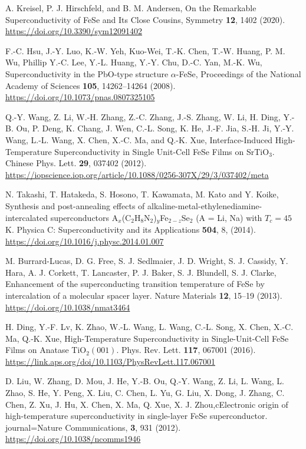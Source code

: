 \documentclass[prb,twocolumn,amsmath,amssymb,superscriptaddress,floatfix,nofootinbib]{revtex4-2}
\begin{document}
\begin{thebibliography}{}
A. Kreisel, P. J. Hirschfeld, and B. M. Andersen, On the Remarkable Superconductivity of FeSe and Its Close Cousins, Symmetry {\bf 12}, 1402
(2020). \url{https://doi.org/10.3390/sym12091402}

F.-C. Hsu, J.-Y. Luo, K.-W. Yeh, Kuo-Wei, T.-K. Chen, T.-W. Huang, P. M. Wu, Phillip Y.-C. Lee, Y.-L. Huang, Y.-Y. Chu, D.-C. Yan, M.-K. Wu, {Superconductivity in the {PbO}-type structure {$\alpha$-FeSe}}, {Proceedings of the National Academy of Sciences} {\bf 105}, {14262--14264} (2008). \url{https://doi.org/10.1073/pnas.0807325105}

Q.-Y. Wang, Z. Li, W.-H. Zhang, Z.-C. Zhang, J.-S. Zhang, W. Li, H. Ding, Y.-B. Ou, P. Deng, K. Chang, J. Wen, C.-L. Song, K. He, J.-F. Jia, S.-H. Ji, Y.-Y. Wang, L.-L. Wang, X. Chen, X.-C. Ma,  and Q.-K. Xue, {{Interface-Induced High-Temperature Superconductivity in Single Unit-Cell {FeSe} Films on SrTiO$_3$}}. {Chinese Phys. Lett.} {\bf 29}, 037402 (2012). 
\url{https://iopscience.iop.org/article/10.1088/0256-307X/29/3/037402/meta}

N. Takashi, T. Hatakeda, S. Hosono, T. Kawamata, M. Kato and Y. Koike, {Synthesis and post-annealing effects of alkaline-metal-ethylenediamine-intercalated superconductors 
{A$_x$(C$_2$H$_8$N$_2$)$_y$Fe$_{2-z}$Se$_2$} ({A = Li, Na}) with {$T_c=45$} K}. {Physica C: Superconductivity and its Applications} {\bf 504}, 8, (2014). \url{https://doi.org/10.1016/j.physc.2014.01.007}


M. Burrard-Lucas, D. G. Free, S. J. Sedlmaier, J. D. Wright, S. J. Cassidy, Y. Hara, A. J. Corkett, T. Lancaster, P. J. Baker, S. J. Blundell, S. J. Clarke, {Enhancement of the superconducting transition temperature of {FeSe} by intercalation of a molecular spacer layer}. Nature Materials {\bf 12}, 15--19 (2013). \url{https://doi.org/10.1038/nmat3464}

	
H. Ding, Y.-F. Lv, K. Zhao, W.-L. Wang, L. Wang, C.-L. Song, X. Chen, X.-C. Ma, Q.-K. Xue, {High-Temperature Superconductivity in Single-Unit-Cell {FeSe} Films on Anatase {TiO$_{2}(001)$}}. Phys. Rev. Lett. {\bf 117}, 
067001 (2016). \url{https://link.aps.org/doi/10.1103/PhysRevLett.117.067001}

D. Liu, W. Zhang, D. Mou, J. He, Y.-B. Ou, Q.-Y. Wang, Z. Li, L. Wang, L. Zhao, S. He, Y. Peng, X. Liu, C. Chen, L. Yu, G. Liu, X. Dong, J. Zhang, C. Chen, Z. Xu, J. Hu, X. Chen, X. Ma, Q. Xue, X. J. Zhou,c{Electronic origin of high-temperature superconductivity in single-layer {FeSe} superconductor}.
journal={Nature Communications}, {\bf 3}, 931 (2012). 
\url{https://doi.org/10.1038/ncomms1946}


\end{thebibliography}
\end{document}
